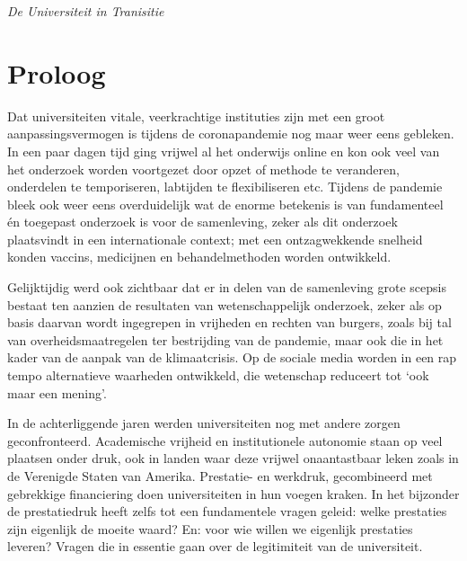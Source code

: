 \documentclass[smallauthor, chapterhaspagenum, nochapterinheader, pagenuminheader,  bigchapnum,medium2, tocpages,  garamond, titleinheader]{jote-book}
\begin{document}
	
\frontmatter
\pagestyle{empty}
\begin{center}
  \vfill
  \emph{De Universiteit in Tranisitie}
  \vfill
\end{center}
\clearpage
\clearpage
\copyrightpage
\clearpage
\titlepage

\cleartorecto
\pagestyle{empty}
\tableofcontents



\cleartoverso
\mainmatter

\pagestyle{ruled}

	\chapter*{ Proloog }

	\nochapterinheader



	Dat universiteiten vitale, veerkrachtige instituties zijn met een groot aanpassingsvermogen is tijdens de coronapandemie nog maar weer eens gebleken. In een paar dagen tijd ging vrijwel al het onderwijs online en kon ook veel van het onderzoek worden voortgezet door opzet of methode te veranderen, onderdelen te temporiseren, labtijden te flexibiliseren etc. Tijdens de pandemie bleek ook weer eens overduidelijk wat de enorme betekenis is van fundamenteel én toegepast onderzoek is voor de samenleving, zeker als dit onderzoek plaatsvindt in een internationale context; met een ontzagwekkende snelheid konden vaccins, medicijnen en behandelmethoden worden ontwikkeld.



	Gelijktijdig werd ook zichtbaar dat er in delen van de samenleving grote scepsis bestaat ten aanzien de resultaten van wetenschappelijk onderzoek, zeker als op basis daarvan wordt ingegrepen in vrijheden en rechten van burgers, zoals bij tal van overheidsmaatregelen ter bestrijding van de pandemie, maar ook die in het kader van de aanpak van de klimaatcrisis. Op de sociale media worden in een rap tempo alternatieve waarheden ontwikkeld, die wetenschap reduceert tot ‘ook maar een mening'.



	In de achterliggende jaren werden universiteiten nog met andere zorgen geconfronteerd. Academische vrijheid en institutionele autonomie staan op veel plaatsen onder druk, ook in landen waar deze vrijwel onaantastbaar leken zoals in de Verenigde Staten van Amerika. Prestatie- en werkdruk, gecombineerd met gebrekkige financiering doen universiteiten in hun voegen kraken. In het bijzonder de prestatiedruk heeft zelfs tot een fundamentele vragen geleid: welke prestaties zijn eigenlijk de moeite waard? En: voor wie willen we eigenlijk prestaties leveren? Vragen die in essentie gaan over de legitimiteit van de universiteit.
\end{document}
